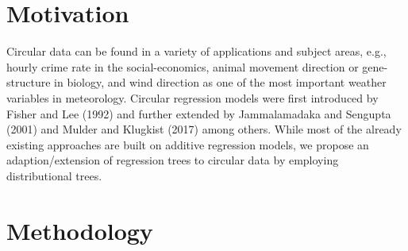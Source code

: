 \documentclass[twoside]{report}
\begin{document}


\section{Motivation}

Circular data can be found in a variety of applications and subject areas, 
e.g., hourly crime rate in the social-economics, 
animal movement direction or gene-structure in biology, 
and wind direction as one of the most important weather variables in meteorology.
Circular regression models were first introduced by Fisher and Lee (1992) and 
further extended by Jammalamadaka and Sengupta (2001) and 
Mulder and Klugkist (2017) among others.
While most of the already existing approaches are built on additive regression models, 
we propose an adaption/extension of regression trees to circular data by employing 
distributional trees.


\section{Methodology}
\end{document}

